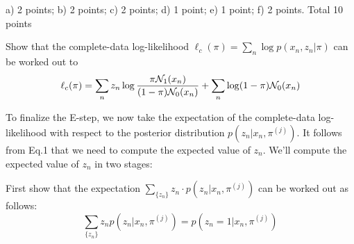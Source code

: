 \documentclass[a4paper]{article}
\newcommand{\tjboxed}[1]{}
\begin{document}
\begin{exam}
\begin{vraag}{a) 2 points; b) 2 points; c) 2 points; d) 1 point; e) 1 point; f) 2 points. Total 10 points}
\begin{deelvraag}
Show that the complete-data log-likelihood $\ell_c(\pi) = \sum_n \log p(x_n,z_n|\pi)$ can be worked out to
\begin{equation}
\ell_c(\pi) = \sum_n z_n \log \frac{\pi\mathcal{N}_1(x_n)}{(1-\pi)\mathcal{N}_0(x_n)} + \sum_n \log(1-\pi)\mathcal{N}_0(x_n)
\label{eq:complete-data-log-likelihood}
\end{equation}
\tjboxed{
\begin{align*}
\ell_c(\pi) &= \sum_n \log p(x_n,z_n|\pi)\\
    &=\sum_n \log  \left([\pi\N_1(x_n)]^{z_n}[(1-\pi)\N_0(x_n)]^{1-z_n}\right) \notag\\
    &=\sum_n z_n \log\pi\N_1(x_n) + \sum_n(1-z_n) \log(1-\pi)\N_0(x_n) \notag\\
    &=\sum_n z_n \log \frac{\pi\N_1(x_n)}{(1-\pi)\N_0(x_n)} + \sum_n \log(1-\pi)\N_0(x_n)
\end{align*}
}%
\end{deelvraag}

To finalize the E-step, we now take the expectation of the complete-data log-likelihood with respect to the posterior distribution $p(z_n|x_n,\pi^{(j)})$. It follows from Eq.1 that we need to compute the expected value of $z_n$.  We'll compute the expected value of $z_n$ in two stages:



\begin{deelvraag}
First show that the expectation $\sum_{\{z_n\}} z_n \cdot p(z_n|x_n,\pi^{(j)})$ can be worked out as follows:
$$
\sum_{\{z_n\}} z_n p(z_n|x_n,\pi^{(j)}) = p(z_n=1|x_n,\pi^{(j)})
$$
\tjboxed{
\begin{align*} \sum_{\{z_n\}}z_np(z_n|x_n,\pi) &= 0\cdot p(z_n=0|x_n,\pi)+1\cdot p(z_n=1|x_n,\pi)\\
    &=p(z_n=1|x_n,\pi)
\end{align*}
}%
\end{deelvraag}


\end{vraag}
\end{exam}
\end{document}
